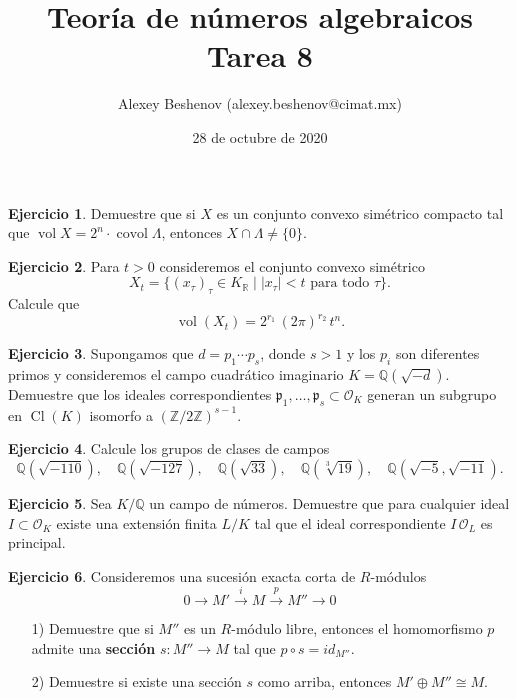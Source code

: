 \documentclass{article}
\title{Teoría de números algebraicos\\Tarea 8}
\author{Alexey Beshenov (alexey.beshenov@cimat.mx)}
\date{28 de octubre de 2020}
\newcounter{tarea}
\theoremstyle{definition}
\newtheorem{ejercicio}{Ejercicio}[tarea]
\DeclareMathOperator{\Cl}{Cl}
\DeclareMathOperator{\covol}{covol}
\DeclareMathOperator{\vol}{vol}
\newcommand{\ZZ}{\mathbb{Z}}
\newcommand{\QQ}{\mathbb{Q}}
\newcommand{\RR}{\mathbb{R}}
\renewcommand{\O}{\mathcal{O}}
\begin{document}
{\sffamily\bfseries\maketitle}

\ifdefined\solutions
\else
\thispagestyle{empty}
\fi

\vspace{1em}

\begin{ejercicio}
  Demuestre que si $X$ es un conjunto convexo simétrico compacto tal que
  $\vol X = 2^n\cdot \covol \Lambda$, entonces $X \cap \Lambda \ne \{ 0 \}$.
\end{ejercicio}

\begin{ejercicio}
  Para $t > 0$ consideremos el conjunto convexo simétrico
  $$X_t = \{ (x_\tau)_\tau \in K_\RR \mid |x_\tau| < t\text{ para todo }\tau \}.$$
  Calcule que
  $$\vol (X_t) = 2^{r_1}\,(2\pi)^{r_2}\,t^n.$$
\end{ejercicio}

\begin{ejercicio}
  Supongamos que $d = p_1\cdots p_s$, donde $s > 1$ y los $p_i$ son diferentes
  primos y consideremos el campo cuadrático imaginario $K = \QQ (\sqrt{-d})$.
  Demuestre que los ideales correspondientes
  $\mathfrak{p}_1,\ldots,\mathfrak{p}_s \subset \O_K$ generan un subgrupo en
  $\Cl (K)$ isomorfo a $(\ZZ/2\ZZ)^{s-1}$.
\end{ejercicio}

\begin{ejercicio}
  Calcule los grupos de clases de campos
  \[ \QQ (\sqrt{-110}), \quad
     \QQ (\sqrt{-127}), \quad
     \QQ (\sqrt{33}), \quad
     \QQ (\sqrt[3]{19}), \quad
     \QQ (\sqrt{-5}, \sqrt{-11}). \]
\end{ejercicio}

\begin{ejercicio}
  Sea $K/\QQ$ un campo de números. Demuestre que para cualquier ideal
  $I \subset \O_K$ existe una extensión finita $L/K$ tal que el ideal
  correspondiente $I\,\O_L$ es principal.
\end{ejercicio}

\begin{ejercicio}
  Consideremos una sucesión exacta corta de $R$-módulos
  $$0 \to M' \xrightarrow{i} M \xrightarrow{p} M'' \to 0$$

  \begin{enumerate}
  \item[1)] Demuestre que si $M''$ es un $R$-módulo libre, entonces
    el homomorfismo $p$ admite una \textbf{sección} $s\colon M'' \to M$
    tal que $p\circ s = id_{M''}$.

  \item[2)] Demuestre si existe una sección $s$ como arriba, entonces
    $M'\oplus M'' \cong M$.
  \end{enumerate}
\end{ejercicio}
\end{document}
